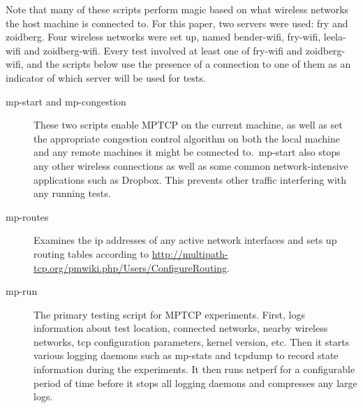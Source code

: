 \documentclass[12pt,a4paper]{article}
\begin{document}
Note that many of these scripts perform magic based on what wireless networks
the host machine is connected to. For this paper, two servers were used: fry and
zoidberg. Four wireless networks were set up, named bender-wifi, fry-wifi,
leela-wifi and zoidberg-wifi. Every test involved at least one of fry-wifi and
zoidberg-wifi, and the scripts below use the presence of a connection to one of
them as an indicator of which server will be used for tests.

\begin{description}
  \item[mp-start and mp-congestion]
    These two scripts enable MPTCP on the current machine, as well as set the
    appropriate congestion control algorithm on both the local machine and any
    remote machines it might be connected to.\ mp-start also stops any other
    wireless connections as well as some common network-intensive applications
    such as Dropbox. This prevents other traffic interfering with any running
    tests.
  \item[mp-routes]
    Examines the ip addresses of any active network interfaces and sets up
    routing tables according to
    \href{http://multipath-tcp.org/pmwiki.php/Users/ConfigureRouting}{http://multipath-tcp.org/\-pmwiki.php/\-Users/\-ConfigureRouting}.
  \item[mp-run]
    The primary testing script for MPTCP experiments. First, logs information
    about test location, connected networks, nearby wireless networks, tcp
    configuration parameters, kernel version, etc. Then it starts various
    logging daemons such as mp-stats and tcpdump to record state information
    during the experiments. It then runs netperf for a configurable period of
    time before it stops all logging daemons and compresses any large logs.


\end{description}
\end{document}
